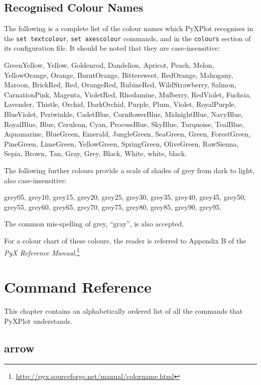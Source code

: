 \documentclass[a4paper,onecolumn,11pt]{book}
\begin{document}
\section{Recognised Colour Names}
\label{colour_names}

The following is a complete list of the colour names which PyXPlot recognises in the \texttt{set textcolour}, \texttt{set axescolour} commands, and in the \texttt{colours} section of its configuration file. It should be noted that they are case-insensitive:

GreenYellow, Yellow, Goldenrod, Dandelion, Apricot, Peach, Melon, YellowOrange, Orange, BurntOrange, Bittersweet, RedOrange, Mahogany, Maroon, BrickRed, Red, OrangeRed, RubineRed, WildStrawberry, Salmon, CarnationPink, Magenta, VioletRed, Rhodamine, Mulberry, RedViolet, Fuchsia, Lavender, Thistle, Orchid, DarkOrchid, Purple, Plum, Violet, RoyalPurple, BlueViolet, Periwinkle, CadetBlue, CornflowerBlue, MidnightBlue, NavyBlue, RoyalBlue, Blue, Cerulean, Cyan, ProcessBlue, SkyBlue, Turquoise, TealBlue, Aquamarine, BlueGreen, Emerald, JungleGreen, SeaGreen, Green, ForestGreen, PineGreen, LimeGreen, YellowGreen, SpringGreen, OliveGreen, RawSienna, Sepia, Brown, Tan, Gray, Grey, Black, White, white, black.

The following further colours provide a scale of shades of grey from dark to light, also case-insensitive:

grey05, grey10, grey15, grey20, grey25, grey30, grey35, grey40, grey45, grey50, grey55, grey60, grey65, grey70, grey75, grey80, grey85, grey90, grey95.

The common mis-spelling of grey, ``gray'', is also accepted.

For a colour chart of these colours, the reader is referred to Appendix B of the \textit{PyX Reference Manual}.\footnote{\url{http://pyx.sourceforge.net/manual/colorname.html}}

\chapter{Command Reference}

This chapter contains an alphabetically ordered list of all the commands that
PyXPlot understands.

\section{arrow}
\end{document}
